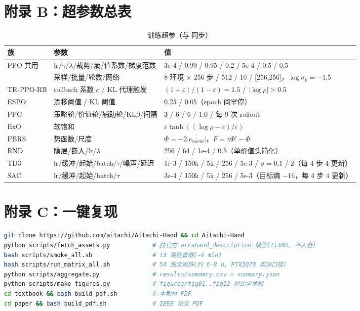 \section{附录 B：超参数总表}
\begin{table}[h]\centering\small
\caption{训练超参（与  同步）}\label{tab:hp}
\begin{tabular}{lp{5.6cm}p{6.4cm}}
\toprule
族 & 参数 & 值 \\
\midrule
PPO 共用 & lr/$\gamma$/$\lambda$/裁剪/熵/值系数/梯度范数 & 3e-4 / 0.99 / 0.95 / 0.2 / 5e-4 / 0.5 / 0.5 \\
 & 采样/批量/轮数/网络 & 8 环境 $\times$ 256 步 / 512 / 10 / [256,256]，$\log\sigma_0{=}-1.5$ \\
TR-PPO-RB & rollback 系数 $c$ / KL 代理触发 & $(1{+}\varepsilon)/(1{-}\varepsilon){=}1.5$ / $|\log\rho|{>}0.5$ \\
ESPO & 漂移阈值 / KL 阈值 & 0.25 / 0.05（epoch 间早停） \\
PPG & 策略轮/价值轮/辅助轮/KL$\beta$/间隔 & 3 / 6 / 6 / 1.0 / 每 9 次 rollout \\
ExO & 软饱和 & $\varepsilon\tanh((\log\rho{-}\varepsilon)/\varepsilon)$ \\
PBRS & 势函数/尺度 & $\Phi{=}-2\overline{|e_{norm}|}$，$F{=}\gamma\Phi'{-}\Phi$ \\
RND & 隐层/嵌入/lr/$\lambda$ & 256 / 64 / 1e-4 / 0.5（单价值头简化） \\
TD3 & lr/缓冲/起始/batch/$\tau$/噪声/延迟 & 1e-3 / 150k / 5k / 256 / 5e-3 / $\sigma{=}0.1$ / 2（每 4 步 4 更新） \\
SAC & lr/缓冲/起始/batch/$\tau$ & 3e-4 / 150k / 5k / 256 / 5e-3（目标熵 $-16$，每 4 步 4 更新） \\
\bottomrule
\end{tabular}
\end{table}

\section{附录 C：一键复现}
\begin{lstlisting}[language=bash]
git clone https://github.com/aitachi/Aitachi-Hand && cd Aitachi-Hand
python scripts/fetch_assets.py            # 拉官方 orcahand_description 模型(111MB, 不入仓)
bash scripts/smoke_all.sh                 # 13 路径冒烟(~4 min)
bash scripts/run_matrix_all.sh            # 54 跑全矩阵(约 6-8 h, RTX3070 实测口径)
python scripts/aggregate.py               # results/summary.csv + summary.json
python scripts/make_figures.py            # figures/fig01..fig12 对比学术图
cd textbook && bash build_pdf.sh          # 本教材 PDF
cd paper && bash build_pdf.sh             # IEEE 论文 PDF
\end{lstlisting}

